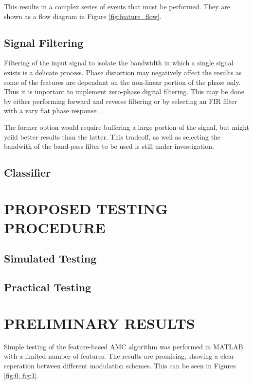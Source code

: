 \documentclass[10pt,twocolumn]{witseiepaper}
\begin{document}
			This results in a complex series of events that must be performed. They are shown as a flow diagram in Figure \ref{fig:feature_flow}.

		\subsection{Signal Filtering}
			Filtering of the input signal to isolate the bandwidth in which a single signal exists is a delicate process. 
			Phase distortion may negatively affect the results as some of the features are dependant on the non-linear portion of the phase only. 
			Thus it is important to implement zero-phase digital filtering.
			This may be done by either performing forward and reverse filtering or by selecting an FIR filter with a vary flat phase response \cite{something?}.

			The former option would require buffering a large portion of the signal, but might yeild better results than the latter. This tradeoff, as well as selecting the bandwith of the band-pass filter to be used is still under investigation.

		\subsection{Classifier}


\section{PROPOSED TESTING PROCEDURE}
	\subsection{Simulated Testing}
	\subsection{Practical Testing}

\section{PRELIMINARY RESULTS}
	Simple testing of the feature-based AMC algorithm was performed in MATLAB with a limited number of features. The results are promising, showing a clear seperation between different modulation schemes. This can be seen in Figures \ref{fig:0, fig:1}. 
\end{document}
